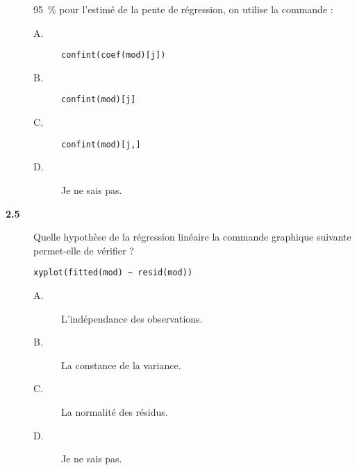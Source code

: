 \documentclass[11pt]{report}
\theoremstyle{definition}
\begin{document}
\begin{description}
  95~\% pour l'estimé de la pente de régression, on utilise la commande :
  \begin{description}
  \item[A.] \verb|confint(coef(mod)[j])|
  \item[B.] \verb|confint(mod)[j]|
  \item[C.] \verb|confint(mod)[j,]|
  \item[D.] Je ne sais pas.
  \end{description}  
\item[\bf 2.5]  Quelle hypothèse de la régression
  linéaire la commande graphique suivante permet-elle de vérifier ?
\begin{verbatim}
xyplot(fitted(mod) ~ resid(mod))    
\end{verbatim}
  \begin{description}
  \item[A.] L'indépendance des observations.
  \item[B.] La constance de la variance.
  \item[C.] La normalité des résidus.
  \item[D.] Je ne sais pas.
  \end{description}
\end{description}
\end{document}
